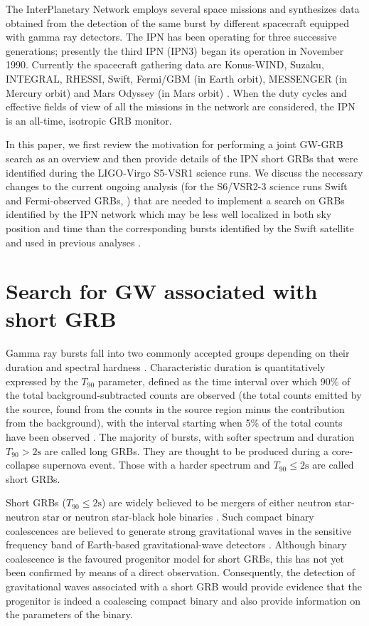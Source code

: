 \documentclass[a4paper]{jpconf}
\begin{document}
The InterPlanetary Network \cite{Hurley:2002wv, Hurley:1999ym} employs several space missions and synthesizes data obtained from the detection of the same burst by different spacecraft equipped with gamma ray detectors. The IPN has been operating for three successive generations; presently the third IPN (IPN3) began its operation in November 1990. Currently the spacecraft gathering data are Konus-WIND, Suzaku, INTEGRAL,  RHESSI, Swift, Fermi/GBM (in Earth orbit), MESSENGER (in Mercury orbit) and Mars Odyssey (in Mars orbit) \cite{HurleyHTML}. When the duty cycles and effective fields of view of all the missions in the network are considered, the IPN is an all-time, isotropic GRB monitor.

In this paper, we first review the motivation for performing a joint GW-GRB search as an overview and then provide details of the IPN short GRBs that were identified during the LIGO-Virgo S5-VSR1 science runs.  We discuss the necessary changes to the current ongoing analysis (for the S6/VSR2-3 science runs Swift and Fermi-observed GRBs, \cite{lvc:s6grb, Harry:2010fr}) that are needed to implement a search on GRBs identified by the IPN network which may be less well localized in both sky position and time than the corresponding bursts identified by the Swift satellite and used in previous analyses \cite{Abadie:2010uf, Collaboration:2009kk}.


\section{Search for GW associated with short GRB}

Gamma ray bursts fall into two commonly accepted groups depending on their duration and spectral hardness \cite{Nakar:2007, Qinx:2010kp}. Characteristic duration is quantitatively expressed by the $T_{90}$ parameter, defined as the time interval over which 90\% of the total background-subtracted counts are observed (the total counts emitted by the source, found from the counts in the source region minus the contribution from the background), with the interval starting when 5\% of the total counts have been observed \cite{McBreen:2001fd}.  The majority of bursts, with softer spectrum and duration $T_{90} > \mathrm{2s}$ are called long GRBs. They are thought to be produced during a core-collapse supernova event.  Those with a harder spectrum and $T_{90} \leq \mathrm{2s}$ are called short GRBs.  

Short GRBs ($T_{90} \leq \mathrm{2s}$) are widely believed to be mergers of either neutron star-neutron star or neutron star-black hole binaries \cite{Nakar:2007}. Such compact binary coalescences are believed to generate strong gravitational waves in the sensitive frequency band of Earth-based gravitational-wave detectors \cite{Blanchet:2001aw,BD89}. Although binary coalescence is the favoured progenitor model for short GRBs, this has not yet been confirmed by means of a direct observation.  Consequently, the detection of gravitational waves associated with a short GRB would provide evidence that the progenitor is indeed a coalescing compact binary and also provide information on the parameters of the binary.  
\end{document}
